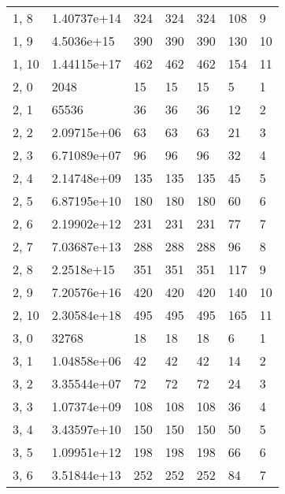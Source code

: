\begin{table}
\begin{tabular}{lllllll}
1, 8   &  1.40737e+14 &         324 &       324 &         324 &      108 &     9 \\
1, 9   &   4.5036e+15 &         390 &       390 &         390 &      130 &    10 \\
1, 10  &  1.44115e+17 &         462 &       462 &         462 &      154 &    11 \\
2, 0   &         2048 &          15 &        15 &          15 &        5 &     1 \\
2, 1   &        65536 &          36 &        36 &          36 &       12 &     2 \\
2, 2   &  2.09715e+06 &          63 &        63 &          63 &       21 &     3 \\
2, 3   &  6.71089e+07 &          96 &        96 &          96 &       32 &     4 \\
2, 4   &  2.14748e+09 &         135 &       135 &         135 &       45 &     5 \\
2, 5   &  6.87195e+10 &         180 &       180 &         180 &       60 &     6 \\
2, 6   &  2.19902e+12 &         231 &       231 &         231 &       77 &     7 \\
2, 7   &  7.03687e+13 &         288 &       288 &         288 &       96 &     8 \\
2, 8   &   2.2518e+15 &         351 &       351 &         351 &      117 &     9 \\
2, 9   &  7.20576e+16 &         420 &       420 &         420 &      140 &    10 \\
2, 10  &  2.30584e+18 &         495 &       495 &         495 &      165 &    11 \\
3, 0   &        32768 &          18 &        18 &          18 &        6 &     1 \\
3, 1   &  1.04858e+06 &          42 &        42 &          42 &       14 &     2 \\
3, 2   &  3.35544e+07 &          72 &        72 &          72 &       24 &     3 \\
3, 3   &  1.07374e+09 &         108 &       108 &         108 &       36 &     4 \\
3, 4   &  3.43597e+10 &         150 &       150 &         150 &       50 &     5 \\
3, 5   &  1.09951e+12 &         198 &       198 &         198 &       66 &     6 \\
3, 6   &  3.51844e+13 &         252 &       252 &         252 &       84 &     7 \\

\end{tabular}
\end{table}

